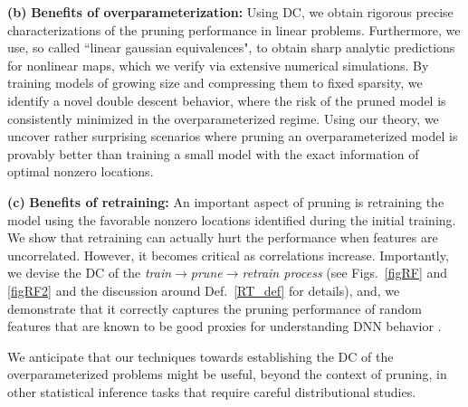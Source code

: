 \noindent\textbf{(b)} {\bf{Benefits of overparameterization:}} Using DC, we 
{obtain rigorous precise characterizations of  the pruning performance in linear problems. Furthermore, we use, so called ``linear gaussian equivalences", to obtain sharp analytic predictions for nonlinear maps, which we verify via extensive numerical simulations.}
 By training models of growing size and compressing them to fixed sparsity, we identify a novel double descent behavior, where the risk of the pruned model is 
{consistently} minimized in the overparameterized regime. Using our theory, we uncover rather surprising scenarios where pruning an overparameterized model is provably better than training a small model with the exact information of optimal nonzero locations. 

\noindent\textbf{(c)} {\bf{Benefits of retraining:}} An important aspect of pruning is retraining the model using the favorable nonzero locations identified during the initial training. We show that retraining can actually hurt the performance when features are uncorrelated. However, it becomes critical as correlations increase. Importantly, we devise the DC of the {\em{train$\rightarrow$prune$\rightarrow$retrain process}} (see Figs.~\ref{figRF} and \ref{figRF2} and the discussion around Def.~\ref{RT_def} for details), and, we demonstrate that it correctly captures the pruning performance of random features  that are known to be good proxies for understanding DNN behavior \cite{jacot2018neural}. 

{We anticipate that our techniques towards establishing the DC of the overparameterized problems might be useful, beyond the context of pruning, in other statistical inference tasks that require careful distributional studies.}



